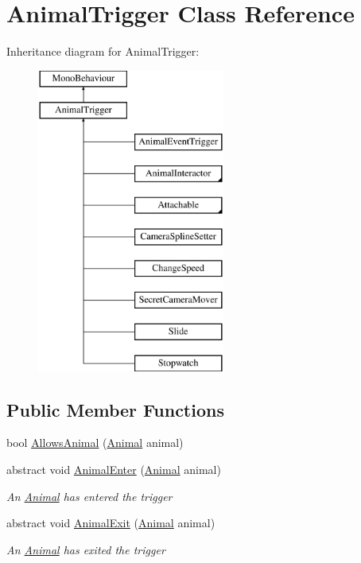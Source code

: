 \hypertarget{class_animal_trigger}{}\section{Animal\+Trigger Class Reference}
\label{class_animal_trigger}
Inheritance diagram for Animal\+Trigger\+:\begin{figure}[H]
\begin{center}
\leavevmode
\includegraphics[height=10.000000cm]{class_animal_trigger}
\end{center}
\end{figure}
\subsection*{Public Member Functions}
\begin{DoxyCompactItemize}
\item 
bool \mbox{\hyperlink{class_animal_trigger_ae8394dfcf5f91b8c413959a4d6baa3a9}{Allows\+Animal}} (\mbox{\hyperlink{class_animal}{Animal}} animal)
\item 
abstract void \mbox{\hyperlink{class_animal_trigger_a03181803fa268e0bfcbdc752ee733c40}{Animal\+Enter}} (\mbox{\hyperlink{class_animal}{Animal}} animal)
\begin{DoxyCompactList}\small\item\em An \mbox{\hyperlink{class_animal}{Animal}} has entered the trigger \end{DoxyCompactList}\item 
abstract void \mbox{\hyperlink{class_animal_trigger_aa1a7c2e90de76c2e089b2bae01813f5c}{Animal\+Exit}} (\mbox{\hyperlink{class_animal}{Animal}} animal)
\begin{DoxyCompactList}\small\item\em An \mbox{\hyperlink{class_animal}{Animal}} has exited the trigger \end{DoxyCompactList}\end{DoxyCompactItemize}
